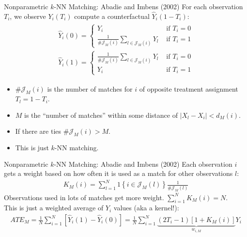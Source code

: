 \documentclass[xcolor=pdftex,dvipsnames,table,mathserif,aspectratio=169]{beamer}
\begin{document}
\begin{frame}{Nonparametric $k$-NN Matching: Abadie and Imbens (2002)}
For each observation $T_i$, we observe $Y_i(T_i)$ compute a \alert{counterfactual} $\hat{Y}_i(1-T_i)$:
\begin{align*}
\begin{array}{l}
\widehat{Y}_{i}(0)=\left\{\begin{array}{cl}
Y_{i} & \text { if } T_{i}=0 \\
\frac{1}{\# \mathcal{J}_{M}(i)} \sum_{l \in \mathcal{J}_{M}(i)} Y_{l} & \text { if } T_{i}=1
\end{array}\right. \\
\widehat{Y}_{i}(1)=\left\{\begin{array}{cc}
\frac{1}{\# \mathcal{J}_{M}(i)} \sum_{l \in \mathcal{J}_{M}(i)} Y_{l} & \text { if } T_{i}=0 \\
Y_{i} & \text { if } T_{i}=1
\end{array}\right.
\end{array}
\end{align*}
\begin{itemize}
\item $\# \mathcal{J}_{M}(i)$ is the number of matches for $i$ of opposite treatment assignment $T_l =1-T_i$.
\item $M$ is the ``number of matches'' within some distance of $|X_l -X_i|< d_M(i)$.
\item If there are ties $\# \mathcal{J}_{M}(i) > M$.
\item This is just $k$-NN matching.
\end{itemize}
\end{frame}


\begin{frame}{Nonparametric $k$-NN Matching: Abadie and Imbens (2002)}
Each observation $i$ gets a weight based on how often it is used as a match for other observations $l$:
\begin{align*}
K_{M}(i)=\sum_{l=1}^{N} 1\left\{i \in \mathcal{J}_{M}(l)\right\} \frac{1}{\# \mathcal{J}_{M}(l)}
\end{align*}
 Observations used in lots of matches get more weight. $\sum_{i=1}^N K_{M}(i) = N$.\\
 
This is just a weighted average of $Y_i$ values (aka a \alert{kernel}!):
\begin{align*}
ATE_M=\frac{1}{N} \sum_{i=1}^{N}\left[ \widehat{Y}_{i}(1)-\widehat{Y}_{i}(0)\right]=\frac{1}{N} \sum_{i=1}^{N} \underbrace{\left(2 T_{i}-1\right)\left[1+K_{M}(i)\right]}_{w_{i,M}} Y_{i}
\end{align*}
\end{frame}
\end{document}
